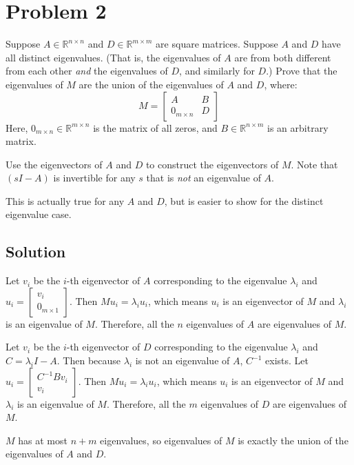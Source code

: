 \documentclass[11pt]{report}
\theoremstyle{definition}
\begin{document}
\section*{Problem 2}
Suppose $A \in \mathbb{R}^{n \times n}$ and $D \in \mathbb{R}^{m \times m}$ are square matrices. Suppose $A$ and $D$ have all distinct eigenvalues. (That is, the eigenvalues of $A$ are from both different from each other {\em and} the eigenvalues of $D$, and similarly for $D$.) Prove that the eigenvalues of $M$ are the union of the eigenvalues of $A$ and $D$, where:
\[
M =
\begin{bmatrix}
A & B \\
0_{m \times n} & D
\end{bmatrix}
\]
Here, $0_{m \times n} \in \mathbb{R}^{m \times n}$ is the matrix of all zeros, and $B \in \mathbb{R}^{n \times m}$ is an arbitrary matrix.

 Use the eigenvectors of $A$ and $D$ to construct the eigenvectors of $M$. Note that $(sI-A)$ is invertible for any $s$ that is {\em not} an eigenvalue of $A$.

 This is actually true for any $A$ and $D$, but is easier to show for the distinct eigenvalue case.
\subsection*{Solution}
Let $v_i$ be the $i$-th eigenvector of $A$ corresponding to the eigenvalue $\lambda_i$ and $u_i = \begin{bmatrix}v_i\\0_{m \times 1}\end{bmatrix}$. Then $Mu_i = \lambda_i u_i$, which means $u_i$ is an eigenvector of $M$ and $\lambda_i$ is an eigenvalue of $M$. Therefore, all the $n$ eigenvalues of $A$ are eigenvalues of $M$.

\noindent Let $v_i$ be the $i$-th eigenvector of $D$ corresponding to the eigenvalue $\lambda_i$ and $C = \lambda_iI - A$. Then because $\lambda_i$ is not an eigenvalue of $A$, $C^{-1}$ exists. Let $u_i = \begin{bmatrix}C^{-1}Bv_i\\v_i\end{bmatrix}$. Then $Mu_i = \lambda_i u_i$, which means $u_i$ is an eigenvector of $M$ and $\lambda_i$ is an eigenvalue of $M$. Therefore, all the $m$ eigenvalues of $D$ are eigenvalues of $M$.

\noindent $M$ has at most $n+m$ eigenvalues, so eigenvalues of $M$ is exactly the union of the eigenvalues of $A$ and $D$.
\end{document}
